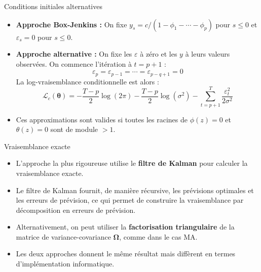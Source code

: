 \documentclass[11pt,aspectratio=169]{beamer}
\begin{document}
\begin{frame}{Conditions initiales alternatives}

\begin{itemize}

\item \textbf{Approche Box-Jenkins :} On fixe $y_s = c/(1 - \phi_1 - \cdots - \phi_p)$ pour $s \leq 0$ et $\varepsilon_s = 0$ pour $s \leq 0$.\newline

\item \textbf{Approche alternative :} On fixe les $\varepsilon$ à zéro et les $y$ à leurs valeurs observées. On commence l'itération à $t = p + 1$ :
  \[
  \varepsilon_p = \varepsilon_{p-1} = \cdots = \varepsilon_{p-q+1} = 0
  \]
  La log-vraisemblance conditionnelle est alors :
  \[
  \mathcal{L}_c(\bm{\theta}) = -\frac{T-p}{2}\log(2\pi) - \frac{T-p}{2}\log(\sigma^2) - \sum_{t=p+1}^{T}\frac{\varepsilon_t^2}{2\sigma^2}
  \]\newline

\item Ces approximations sont valides si toutes les racines de $\phi(z) = 0$ et $\theta(z) = 0$ sont de module $> 1$.

\end{itemize}

\end{frame}

\begin{frame}{Vraisemblance exacte}

\begin{itemize}

\item L'approche la plus rigoureuse utilise le \textbf{filtre de Kalman} pour calculer la vraisemblance exacte.\newline

\item Le filtre de Kalman fournit, de manière récursive, les prévisions optimales et les erreurs de prévision, ce qui permet de construire la vraisemblance par décomposition en erreurs de prévision.\newline

\item Alternativement, on peut utiliser la \textbf{factorisation triangulaire} de la matrice de variance-covariance $\bm{\Omega}$, comme dans le cas MA.\newline

\item Les deux approches donnent le même résultat mais diffèrent en termes d'implémentation informatique.

\end{itemize}

\end{frame}
\end{document}

